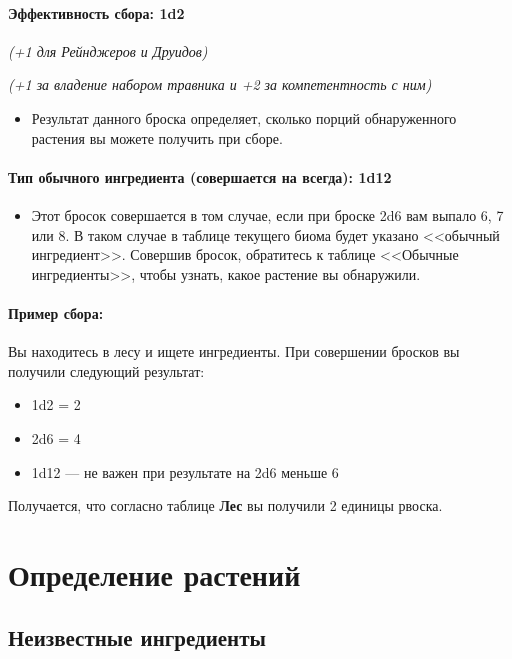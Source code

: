\documentclass[a4paper, 9pt, twocolumn]{book}
\begin{document}
	\paragraph*{Эффективность сбора: 1d2}
	
	\noindent\textit{(+1 для Рейнджеров и Друидов)}
	
	\noindent\textit{(+1 за владение набором травника и +2 за компетентность с ним)}
	\noindent
	\begin{itemize}
		\item Результат данного броска определяет, сколько порций обнаруженного растения вы можете получить при сборе. 
	\end{itemize}

	\paragraph*{Тип обычного ингредиента (совершается на всегда): 1d12}
	
	\begin{itemize}
		\item Этот бросок совершается в том случае, если при броске 2d6 вам выпало 6, 7 или 8. В таком случае в таблице текущего биома будет указано <<обычный ингредиент>>. Совершив бросок, обратитесь к таблице <<Обычные ингредиенты>>, чтобы узнать, какое растение вы обнаружили.
	\end{itemize}
	
	\paragraph*{Пример сбора:}
	
	Вы находитесь в лесу и ищете ингредиенты. При совершении бросков вы получили следующий результат:
	
	\begin{itemize}
		\item 1d2 = 2
		\item 2d6 = 4
		\item 1d12 --- не важен при результате на 2d6 меньше 6
	\end{itemize}

	Получается, что согласно таблице \textbf{Лес} вы получили 2 единицы рвоска.
	
	\section{Определение растений}
	
	\subsection{Неизвестные ингредиенты}
	
\end{document}
